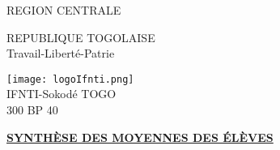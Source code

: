 \documentclass[10pt,a4paper]{article}
\begin{document}
\begin{minipage}{12cm}
\textsf{REGION CENTRALE} \\ \hspace{1cm}
\end{minipage}
\begin{minipage}{5cm}
REPUBLIQUE TOGOLAISE\\
Travail-Liberté-Patrie
\end{minipage}
\begin{minipage}{3cm}
\begin{center}
\texttt{[image: logoIfnti.png]} \\ \hspace{1cm}
IFNTI-Sokodé TOGO\\300 BP 40
\end{center}
\end{minipage}

\begin{center}
\underline{\textbf{SYNTHÈSE DES MOYENNES DES ÉLÈVES}}
\end{center}
\end{document}
